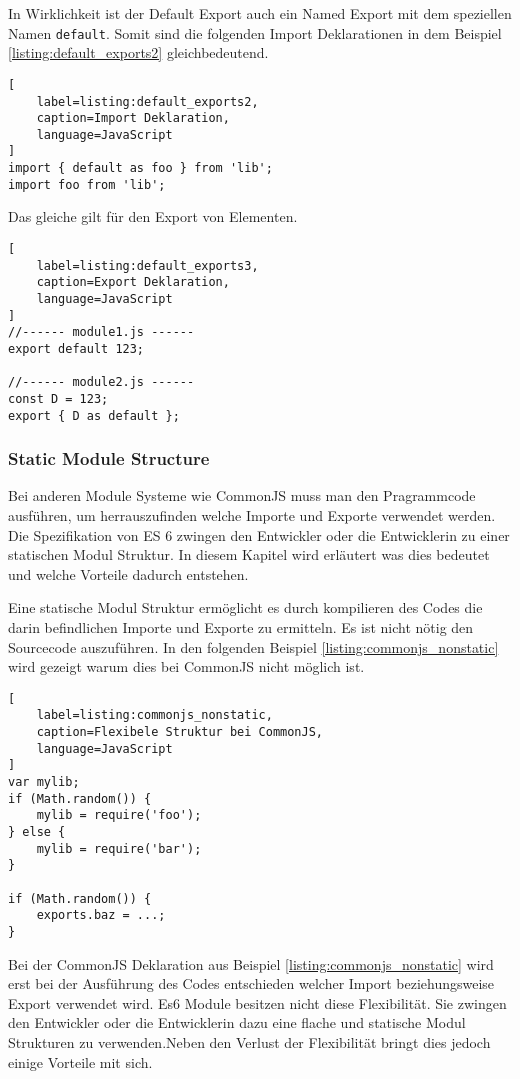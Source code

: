 In Wirklichkeit ist der Default Export auch ein Named Export mit dem speziellen Namen \lstinline{default}. Somit sind die folgenden Import Deklarationen in dem Beispiel \ref{listing:default_exports2} gleichbedeutend. \autocite{AxelRauschmayer2014}

 \begin{lstlisting}[
    label=listing:default_exports2,
    caption=Import Deklaration,
	language=JavaScript
]
import { default as foo } from 'lib';
import foo from 'lib';
\end{lstlisting}

Das gleiche gilt für den Export von Elementen.

\begin{lstlisting}[
    label=listing:default_exports3,
    caption=Export Deklaration,
	language=JavaScript
]
//------ module1.js ------
export default 123;

//------ module2.js ------
const D = 123;
export { D as default };
\end{lstlisting}

\subsubsection{Static Module Structure}
Bei anderen Module Systeme wie CommonJS muss man den Pragrammcode ausführen, um herrauszufinden welche Importe und Exporte verwendet werden. Die Spezifikation von ES 6 zwingen den Entwickler oder die Entwicklerin zu einer statischen Modul Struktur. In diesem Kapitel wird erläutert was dies bedeutet und welche Vorteile dadurch entstehen.
\autocite{AxelRauschmayer2014}

Eine statische Modul Struktur ermöglicht es durch kompilieren des Codes die darin befindlichen Importe und Exporte zu ermitteln. Es ist nicht nötig den Sourcecode auszuführen. In den folgenden Beispiel \ref{listing:commonjs_nonstatic} wird gezeigt warum dies bei CommonJS nicht möglich ist. \autocite{AxelRauschmayer2014}

\begin{lstlisting}[
    label=listing:commonjs_nonstatic,
    caption=Flexibele Struktur bei CommonJS,
	language=JavaScript
]
var mylib;
if (Math.random()) {
    mylib = require('foo');
} else {
    mylib = require('bar');
}

if (Math.random()) {
    exports.baz = ...;
}
\end{lstlisting}

Bei der CommonJS Deklaration aus Beispiel \ref{listing:commonjs_nonstatic} wird erst bei der Ausführung des Codes entschieden welcher Import beziehungsweise Export verwendet wird. Es6 Module besitzen nicht diese Flexibilität. Sie zwingen den Entwickler oder die Entwicklerin dazu eine flache und statische Modul Strukturen zu verwenden.Neben den Verlust der Flexibilität bringt dies jedoch einige Vorteile mit sich. \autocite{AxelRauschmayer2014}

